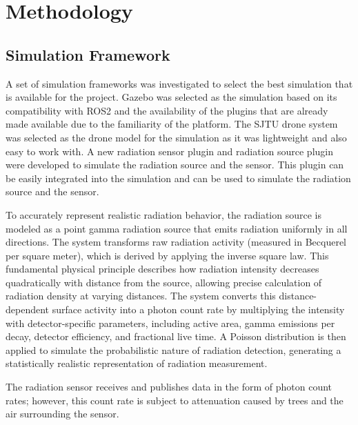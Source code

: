 \documentclass[../report.tex]{subfiles}
\begin{document}
    \section{Methodology}
    \label{sec:methodology}


    \subsection{Simulation Framework}
    A set of simulation frameworks was investigated to select the best simulation that is available for the project. Gazebo was selected as the simulation based on its compatibility with ROS2 
    and the availability of the plugins that are already made available due to the familiarity of the platform. The SJTU drone system was selected as the drone model for the simulation as it was 
    lightweight and also easy to work with. A new radiation sensor plugin and radiation source plugin were developed to simulate the radiation source and the sensor. This plugin can be easily 
    integrated into the simulation and can be used to simulate the radiation source and the sensor. 
        
    To accurately represent realistic radiation behavior, the radiation source is modeled as a point gamma radiation source that emits radiation uniformly in all directions. 
    The system transforms raw radiation activity (measured in Becquerel per square meter), which is derived by applying the inverse square law. This fundamental physical principle describes how 
    radiation intensity decreases quadratically with distance from the source, allowing precise calculation of radiation density at varying distances. The system converts this distance-dependent 
    surface activity into a photon count rate by multiplying the intensity with detector-specific parameters, including active area, gamma emissions per decay, detector efficiency, and fractional 
    live time. A Poisson distribution is then applied to simulate the probabilistic nature of radiation detection, generating a statistically realistic representation of radiation measurement.


    The radiation sensor receives and publishes data in the form of photon count rates; however, this count rate is subject to attenuation caused by trees and the air surrounding the sensor.
\end{document}

